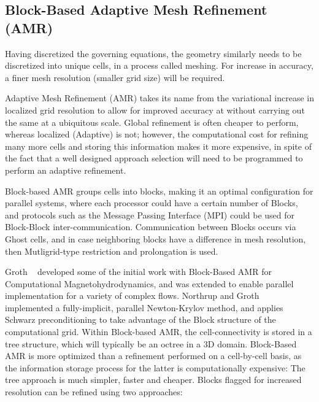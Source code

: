 \subsection{Block-Based Adaptive Mesh Refinement (AMR)}
Having discretized the governing equations, the geometry similarly needs to be discretized into unique cells, in a process called meshing. For increase in accuracy, a finer mesh resolution (smaller grid size) will be required. \par
Adaptive Mesh Refinement (AMR) takes its name from the variational increase in localized grid resolution to allow for improved accuracy at without carrying out the same at a ubiquitous scale. Global refinement is often cheaper to perform, whereas localized (Adaptive) is not; however, the computational cost for refining many more cells and storing this information makes it more expensive, in spite of the fact that a well designed approach selection will need to be programmed to perform an adaptive refinement.\par
Block-based AMR groups cells into blocks, making it an optimal configuration for parallel systems, where each processor could have a certain number of Blocks, and protocols such as the Message Passing Interface (MPI) could be used for Block-Block inter-communication. Communication between Blocks occurs via Ghost cells, and in case neighboring blocks have a difference in mesh resolution, then Mutligrid-type restriction and prolongation is used.\par
Groth \etal ~\cite{Groth:1999} developed some of the initial work with Block-Based AMR for Computational Magnetohydrodynamics, and was extended to enable parallel implementation for a variety of complex flows. Northrup and Groth ~\cite{Northrup:2005b} implemented a fully-implicit, parallel Newton-Krylov method, and applies Schwarz preconditioning to take advantage of the Block structure of the computational grid.
Within Block-based AMR, the cell-connectivity is stored in a tree structure, which will typically be an octree in a 3D domain. Block-Based AMR is more optimized than a refinement performed on a cell-by-cell basis, as the information storage process for the latter is computationally expensive: The tree approach is much simpler, faster and cheaper. Blocks flagged for increased  resolution can be refined using two approaches: \par
